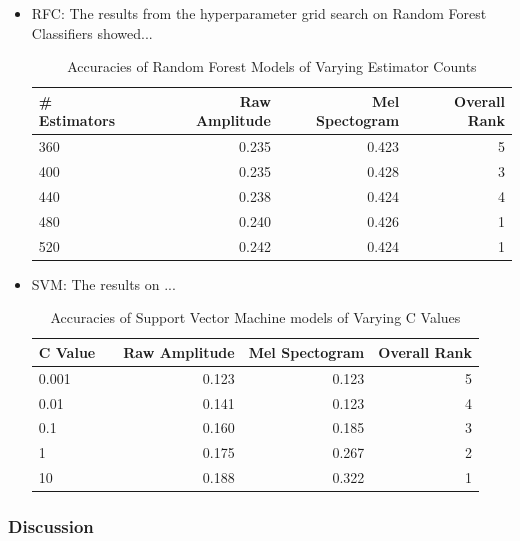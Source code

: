 \documentclass[11pt]{article}
\begin{document}
\begin{itemize}
    \item RFC: The results from the hyperparameter grid search on Random Forest Classifiers showed...
    \begin{table}[h]
    \centering
    \begin{tabular}{llrrr}
        \toprule
        \# Estimators & & Raw Amplitude & Mel Spectogram & Overall Rank \\
        \midrule
        \textsc{360} & & 0.235 & 0.423 & 5 \\
        \textsc{400} & & 0.235 & 0.428 & 3 \\
        \textsc{440} & & 0.238 & 0.424 & 4 \\
        \textsc{480} & & 0.240 & 0.426 & 1 \\
        \textsc{520} & & 0.242 & 0.424 & 1 \\
        \bottomrule
    \end{tabular}
    \caption{\label{tab:rf_search_results} Accuracies of Random Forest Models of Varying Estimator Counts}
    \end{table}
    
    \item SVM: The results on ...
    \begin{table}[h]
    \centering
    \begin{tabular}{llrrr}
        \toprule
        C Value & & Raw Amplitude & Mel Spectogram & Overall Rank \\
        \midrule
        \textsc{0.001} & & 0.123 & 0.123 & 5 \\
        \textsc{0.01}  & & 0.141 & 0.123 & 4 \\
        \textsc{0.1}   & & 0.160 & 0.185 & 3 \\
        \textsc{1}     & & 0.175 & 0.267 & 2 \\
        \textsc{10}    & & 0.188 & 0.322 & 1 \\
        \bottomrule
    \end{tabular}
    \caption{\label{tab:svm_search_results} Accuracies of Support Vector Machine models of Varying C Values}
    \end{table}

\end{itemize}


\subsubsection{Discussion}
\end{document}
